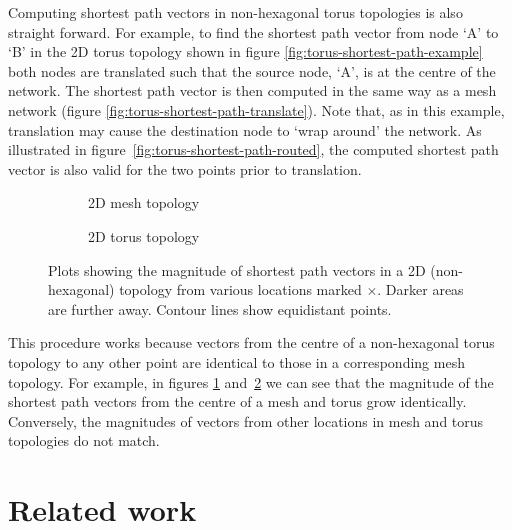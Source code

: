 			Computing shortest path vectors in non-hexagonal torus topologies is also
			straight forward. For example, to find the shortest path vector from node
			`A' to `B' in the 2D torus topology shown in figure
			\ref{fig:torus-shortest-path-example} both nodes are translated such that
			the source node, `A', is at the centre of the network. The shortest path
			vector is then computed in the same way as a mesh network (figure
			\ref{fig:torus-shortest-path-translate}). Note that, as in this example,
			translation may cause the destination node to `wrap around' the network.
			As illustrated in figure~\ref{fig:torus-shortest-path-routed}, the
			computed shortest path vector is also valid for the two points prior to
			translation.
			
			\begin{figure}
				\center
				
				\begin{subfigure}{\linewidth}
					\center
					\caption{2D mesh topology}
					\label{fig:distance-map-mesh}
				\end{subfigure}
				
				\vspace{1em}
				
				\begin{subfigure}{\linewidth}
					\center
					\caption{2D torus topology}
					\label{fig:distance-map-torus}
				\end{subfigure}
				
				\caption{Plots showing the magnitude of shortest path vectors in a 2D
				(non-hexagonal) topology from various locations marked
				{\color{red}$\times$}.  Darker areas are further away. Contour lines show
				equidistant points.}
				
				\label{fig:distance-map}
			\end{figure}
			
			This procedure works because vectors from the centre of a non-hexagonal
			torus topology to any other point are identical to those in a
			corresponding mesh topology. For example, in figures
			\ref{fig:distance-map-mesh} and~\ref{fig:distance-map-torus} we can see
			that the magnitude of the shortest path vectors from the centre of a mesh
			and torus grow identically. Conversely, the magnitudes of vectors from
			other locations in mesh and torus topologies do not match.
		
	\section{Related work}
		
